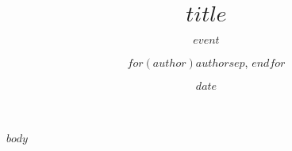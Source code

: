 \documentclass[aspectratio=1610]{beamer}
\title{$title$}
\author[$shortauthor$]{$for(author)$$author$$sep$, $endfor$}
\institute[$shortinstitute$]{$for(institute)$$institute$$sep$\\$endfor$\\$insertemail$}
\subtitle{$event$}
\date{$date$}
\begin{document}
\begin{frame}[plain]
  \titlepage
\end{frame}

$body$
\end{document}
